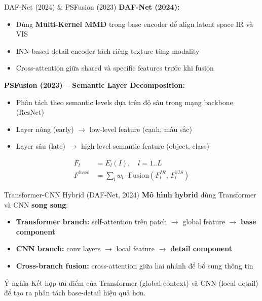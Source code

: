 \documentclass{beamer}
\begin{document}
\begin{frame}{DAF-Net (2024) \& PSFusion (2023)}
    \textbf{DAF-Net (2024):}
    \begin{itemize}
        \item Dùng \textbf{Multi-Kernel MMD} trong base encoder để align latent space IR và VIS
        \item INN-based detail encoder tách riêng texture từng modality
        \item Cross-attention giữa shared và specific features trước khi fusion
    \end{itemize}

    \vspace{0.3cm}
    \textbf{PSFusion (2023) -- Semantic Layer Decomposition:}
    \begin{itemize}
        \item Phân tách theo semantic levels dựa trên độ sâu trong mạng backbone (ResNet)
        \item Layer nông (early) $\to$ low-level feature (cạnh, màu sắc)
        \item Layer sâu (late) $\to$ high-level semantic feature (object, class)
    \end{itemize}
    \begin{align}
        F_l &= E_l(I), \quad l = 1..L \nonumber \\
        F^{\text{fused}} &= \sum_l w_l \cdot \text{Fusion}(F_l^{IR},\, F_l^{VIS})
    \end{align}
\end{frame}

\begin{frame}{Transformer-CNN Hybrid (DAF-Net, 2024)}
    \textbf{Mô hình hybrid} dùng Transformer và CNN \textbf{song song}:

    \vspace{0.3cm}
    \begin{itemize}
        \item \textbf{Transformer branch:} self-attention trên patch $\to$ global feature $\to$ \textbf{base component}
        \item \textbf{CNN branch:} conv layers $\to$ local feature $\to$ \textbf{detail component}
        \item \textbf{Cross-branch fusion:} cross-attention giữa hai nhánh để bổ sung thông tin
    \end{itemize}

    \vspace{0.3cm}
    \begin{block}{Ý nghĩa}
        Kết hợp ưu điểm của Transformer (global context) và CNN (local detail) để tạo ra phân tách base-detail hiệu quả hơn.
    \end{block}
\end{frame}
\end{document}

